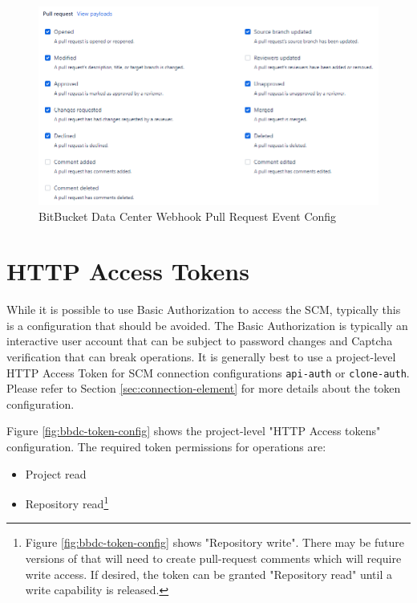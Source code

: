 \begin{figure}[h]
    \includegraphics[width=\textwidth]{graphics/bbdc-pr-event-config.png}
    \caption{BitBucket Data Center Webhook Pull Request Event Config}
    \label{fig:bbdc-pr-event-config}
\end{figure}


\section{\cxoneflow HTTP Access Tokens}

While it is possible to use Basic Authorization to access the SCM, typically this is a configuration that
should be avoided.  The Basic Authorization is typically an interactive user account that can be subject
to password changes and Captcha verification that can break \cxoneflow operations.  It is generally
best to use a project-level HTTP Access Token for SCM connection configurations \texttt{api-auth} or
\texttt{clone-auth}.  Please refer to Section \ref{sec:connection-element} for more details about the token
configuration.

Figure \ref{fig:bbdc-token-config} shows the project-level "HTTP Access tokens" configuration.  The required
token permissions for \cxoneflow operations are:

\begin{itemize}
    \item Project read
    \item Repository read\footnote{Figure \ref{fig:bbdc-token-config} shows "Repository write".  There may be future versions of \cxoneflow that will need to create pull-request comments which will require write access.  If desired, the token can be granted "Repository read" until a write capability is released.}
\end{itemize}


